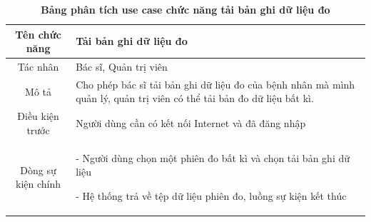   \begin{table}[H]
    \caption{\bfseries \fontsize{12pt}{0pt}\selectfont Bảng phân tích use case chức năng tải bản ghi dữ liệu đo}
    \centering
    \begin{tabularx}{0.9\textwidth}{|c|X|}
      \hline
      \textbf{Tên chức năng} & \textbf{Tải bản ghi dữ liệu đo} \\
      \hline
      Tác nhân & Bác sĩ, Quản trị viên \\
      \hline
      Mô tả & Cho phép bác sĩ tải bản ghi dữ liệu đo của bệnh nhân
      mà mình quản lý, quản trị viên có thể tải bản đo dữ liệu bất kì.\\
      \hline
      Điều kiện trước & Người dùng cần có kết nối Internet và đã đăng nhập \\
      \hline
      Dòng sự kiện chính & 
        - Người dùng chọn một phiên đo bất kì và chọn tải bản ghi dữ liệu

        - Hệ thống trả về tệp dữ liệu phiên đo, luồng sự kiện kết thúc        
        \\
      \hline
    \end{tabularx}
  \end{table}


